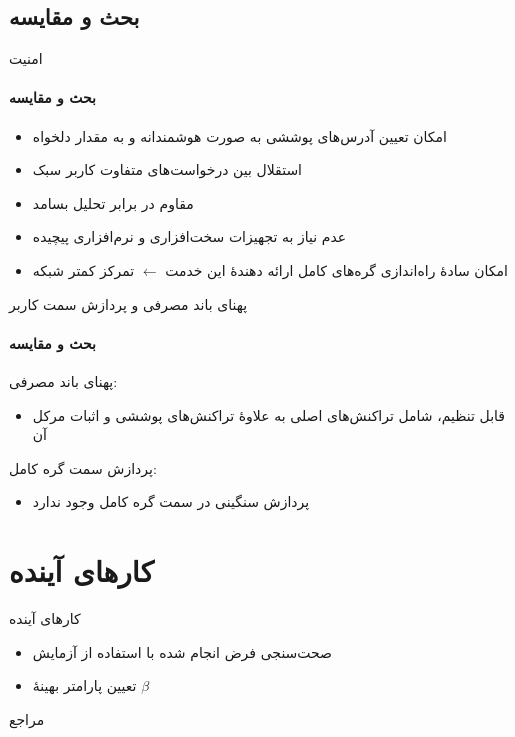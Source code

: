 \documentclass{beamer}
\begin{document}
\subsection{بحث و مقایسه}
\begin{frame}{امنیت}
	\framesubtitle{بحث و مقایسه}
	\begin{itemize}
		\item امکان تعیین آدرس‌های پوششی به صورت هوشمندانه و به مقدار دلخواه
		\item استقلال بین درخواست‌های متفاوت کاربر سبک
		\item مقاوم در برابر تحلیل بسامد
		\item عدم نیاز به تجهیزات سخت‌افزاری و نرم‌افزاری پیچیده
		\item{%
			 امکان سادهٔ راه‌اندازی گره‌های کامل ارائه دهندهٔ این خدمت $\leftarrow$ تمرکز کمتر شبکه}
	\end{itemize}
\end{frame}

\begin{frame}{پهنای باند مصرفی و پردازش سمت کاربر}
	\framesubtitle{بحث و مقایسه}
	پهنای باند مصرفی:
	\begin{itemize}
		\item قابل تنظیم، شامل تراکنش‌های اصلی به علاوهٔ تراکنش‌های پوششی و اثبات مرکل آن
	\end{itemize}

	پردازش سمت گره کامل:
	\begin{itemize}
		\item پردازش سنگینی در سمت گره کامل وجود ندارد
	\end{itemize}
\end{frame}

\section{کارهای آینده\hfill}
\begin{frame}{کارهای آینده}
	\begin{itemize}
		\item صحت‌سنجی فرض انجام شده با استفاده از آزمایش
		\item تعیین پارامتر بهینهٔ $\beta$
	\end{itemize}
\end{frame}

\begin{frame}{مراجع}
	
	\lr{%
		{\small }}
	
\end{frame}
\end{document}
